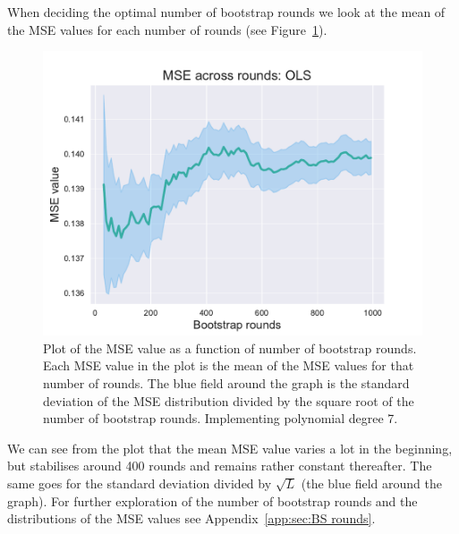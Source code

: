 \documentclass[twocolumn,english,notitlepage]{article}
\begin{document}
            When deciding the optimal number of bootstrap rounds we look at the mean of the MSE values for each number of rounds (see Figure~\ref{res:fig:bs_mse_across_rounds}). 
            \begin{figure}[ht]
                \centering
                \includegraphics[width=\linewidth]{BS_mse_across_rounds_OLS.pdf}
                \caption{Plot of the MSE value as a function of number of bootstrap rounds. Each MSE value in the plot is the mean of the MSE values for that number of rounds. The blue field around the graph is the standard deviation of the MSE distribution divided by the square root of the number of bootstrap rounds. Implementing polynomial degree 7.}
                \label{res:fig:bs_mse_across_rounds}
            \end{figure}
            We can see from the plot that the mean MSE value varies a lot in the beginning, but stabilises around 400 rounds and remains rather constant thereafter. The same goes for the standard deviation divided by $\sqrt{L}$ (the blue field around the graph). For further exploration of the number of bootstrap rounds and the distributions of the MSE values see Appendix~\ref{app:sec:BS rounds}. 
\end{document}
